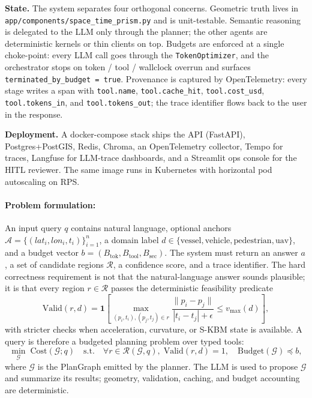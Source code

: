 \documentclass{article}
\begin{document}
\textbf{State.} The system separates four orthogonal concerns. Geometric truth lives in \texttt{app/components/space\_time\_prism.py} and is unit-testable. Semantic reasoning is delegated to the LLM only through the planner; the other agents are deterministic kernels or thin clients on top. Budgets are enforced at a single choke-point: every LLM call goes through the \texttt{TokenOptimizer}, and the orchestrator stops on token / tool / wallclock overrun and surfaces \texttt{terminated\_by\_budget = true}. Provenance is captured by OpenTelemetry: every stage writes a span with \texttt{tool.name}, \texttt{tool.cache\_hit}, \texttt{tool.cost\_usd}, \texttt{tool.tokens\_in}, and \texttt{tool.tokens\_out}; the trace identifier flows back to the user in the response.

\textbf{Deployment.} A docker-compose stack ships the API (FastAPI), Postgres+PostGIS, Redis, Chroma, an OpenTelemetry collector, Tempo for traces, Langfuse \citep{langfuse2024} for LLM-trace dashboards, and a Streamlit ops console for the HITL reviewer. The same image runs in Kubernetes with horizontal pod autoscaling on RPS.

\paragraph{Problem formulation:}
An input query $q$ contains natural language, optional anchors $\mathcal{A}=\{(lat_i,lon_i,t_i)\}_{i=1}^n$, a domain label $d\in\{\text{vessel},\text{vehicle},\text{pedestrian},\text{uav}\}$, and a budget vector $b=(B_{\mathrm{tok}}, B_{\mathrm{tool}}, B_{\mathrm{sec}})$. The system must return an answer $a$, a set of candidate regions $\mathcal{R}$, a confidence score, and a trace identifier. The hard correctness requirement is not that the natural-language answer sounds plausible; it is that every region $r\in\mathcal{R}$ passes the deterministic feasibility predicate
\begin{equation}
  \mathrm{Valid}(r,d) =
  \mathbf{1}\left[
  \max_{(p_i,t_i),(p_j,t_j)\in r}
  \frac{\|p_i-p_j\|}{|t_i-t_j|+\epsilon}
  \le v_{\max}(d)
  \right],
\label{eq:valid}
\end{equation}
with stricter checks when acceleration, curvature, or S-KBM state is available. A query is therefore a budgeted planning problem over typed tools:
\begin{equation}
  \min_{\mathcal{G}}\;\mathrm{Cost}(\mathcal{G};q)
  \quad\text{s.t.}\quad
  \forall r\in\mathcal{R}(\mathcal{G},q),\; \mathrm{Valid}(r,d)=1,\quad
  \mathrm{Budget}(\mathcal{G})\preceq b,
\label{eq:budgeted-plan}
\end{equation}
where $\mathcal{G}$ is the PlanGraph emitted by the planner. The LLM is used to propose $\mathcal{G}$ and summarize its results; geometry, validation, caching, and budget accounting are deterministic.
\end{document}
